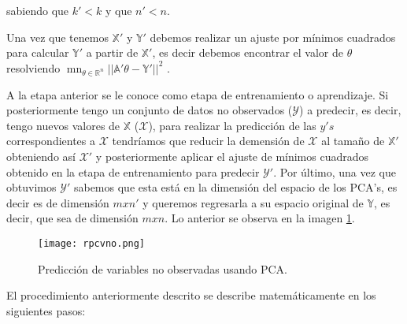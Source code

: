 sabiendo que $k' < k$ y que $n' < n$. 

Una vez que tenemos $\mathbb{X'}$ y $\mathbb{Y'}$ debemos realizar un ajuste por mínimos cuadrados para calcular $\mathbb{Y'}$ a partir de $\mathbb{X'}$, es decir debemos encontrar el valor de $\theta$ resolviendo $\mathop{m\acute{i}n}_{\theta \in \mathbb{R}^{n}} ||\mathbb{A'} \theta - \mathbb{Y'}||^{2}$ .

A la etapa anterior se le conoce como etapa de entrenamiento o aprendizaje. Si posteriormente tengo un conjunto de datos no observados ($\mathcal{Y}$) a predecir, es decir, tengo nuevos valores de $\mathbb{X}$ ($\mathcal{X}$), para realizar la predicción de las $y's$ correspondientes a $\mathcal{X}$ tendríamos que reducir la demensión de $\mathcal{X}$ al tamaño de $\mathbb{X'}$ obteniendo así $\mathcal{X'}$ y posteriormente aplicar el ajuste de mínimos cuadrados obtenido en la etapa de entrenamiento para predecir $\mathcal{Y'}$. Por último, una vez que obtuvimos $\mathcal{Y'}$ sabemos que esta está en la dimensión del espacio de los PCA's, es decir es de dimensión $m x n'$ y queremos regresarla a su espacio original de $\mathbb{Y}$, es decir, que sea de dimensión $m x n$. Lo anterior se observa en la imagen \ref{regresionPCA}.

\begin{figure}
\centering
\texttt{[image: rpcvno.png]}
\caption{Predicción de variables no observadas usando PCA.}\label{regresionPCA}
\end{figure}

El procedimiento anteriormente descrito se describe matemáticamente en los siguientes pasos: 

